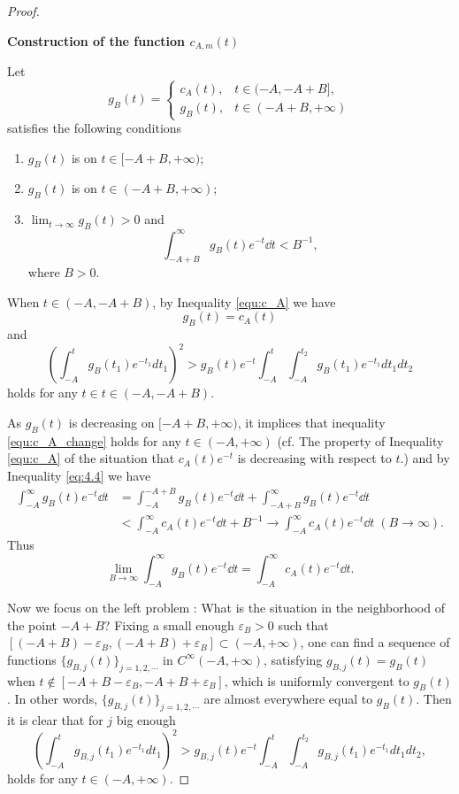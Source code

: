 \begin{proof}
  
  \begin{mdframed}
\begin{center}
  \textbf{Construction of the function $c_{A,m}(t)$}
\end{center}
Let 
\[
  g_B(t)=\begin{cases}
    c_A(t), & t\in (-A,-A+B],\\ 
    g_B(t), & t\in (-A+B,+\infty)
  \end{cases}
\]
satisfies the following conditions 
\begin{enumerate}
  \item $g_B(t)$ is  on $t\in [-A+B,+\infty)$;
  \item $g_B(t)$ is  on $t\in (-A+B,+\infty)$;
  \item $\lim_{t\to\infty} g_B(t)>0$ and 
\begin{equation}
  \label{eq:4.4}
      \int_{-A+B}^{\infty} g_B(t) e^{-t} \dd t<B^{-1},
\end{equation}
  where $B>0$.
\end{enumerate}
  \end{mdframed}
When $t\in (-A,-A+B)$, by Inequality \eqref{equ:c_A} we have 
\[g_B(t)=c_A(t)\]
and 
\begin{equation}
  \label{equ:c_A_change}
  (\int_{-A}^{t}g_{B}(t_{1})e^{-t_{1}}dt_{1})^{2}>g_{B}(t)e^{-t}
  \int_{-A}^{t}\int_{-A}^{t_{2}}g_{B}(t_{1})e^{-t_{1}}dt_{1}dt_{2}
  \end{equation}
holds for any $t\in t\in (-A,-A+B)$.

As $g_B(t)$ is decreasing on $[-A+B,+\infty)$, it implices that inequality \eqref{equ:c_A_change} holds for any $t\in (-A,+\infty)$ (cf. The property of Inequality \eqref{equ:c_A} of the situation that $c_A(t)e^{-t}$ is decreasing with respect to $t$.) and by Inequality \eqref{eq:4.4} we have
\begin{align*}
  \int_{-A}^\infty g_B(t) e^{-t}\dd t &=\int_{-A}^{-A+B} g_B(t) e^{-t}\dd t +\int_{-A+B}^\infty g_B(t) e^{-t}\dd t\\ 
  &<\int_{-A}^\infty c_A(t) e^{-t}\dd t+B^{-1}\rightarrow \int_{-A}^\infty c_A(t) e^{-t}\dd t \;(B\to\infty).
\end{align*}
  Thus 
  \[
    \lim_{B\to\infty} \int_{-A}^\infty g_B(t) e^{-t}\dd t=\int_{-A}^\infty c_A(t) e^{-t}\dd t.
  \]

  Now we focus on the left problem : What is the situation in the neighborhood of the point $-A+B$? Fixing a small enough $\varepsilon_B>0$ such that $[(-A+B)-\varepsilon_B,(-A+B)+\varepsilon_B]\subset (-A,+\infty)$, one can find a sequence of functions
  $\{g_{B,j}(t)\}_{j=1,2,\cdots}$ in $C^{\infty}(-A,+\infty)$,
  satisfying $g_{B,j}(t)=g_{B}(t)$ when
  $t\notin[-A+B-\varepsilon_{B},-A+B+\varepsilon_{B}]$, which is
  uniformly convergent to $g_{B}(t)$. In other words, $\{g_{B,j}(t)\}_{j=1,2,\cdots}$ are almost everywhere equal to $g_B(t)$. Then it is clear that for $j$ big
  enough
  $$(\int_{-A}^{t}g_{B,j}(t_{1})e^{-t_{1}}dt_{1})^{2}
  >g_{B,j}(t)e^{-t}\int_{-A}^{t}
  \int_{-A}^{t_{2}}g_{B,j}(t_{1})e^{-t_{1}}dt_{1}dt_{2},
  $$
  holds for any $t\in(-A,+\infty)$.


\end{proof}
